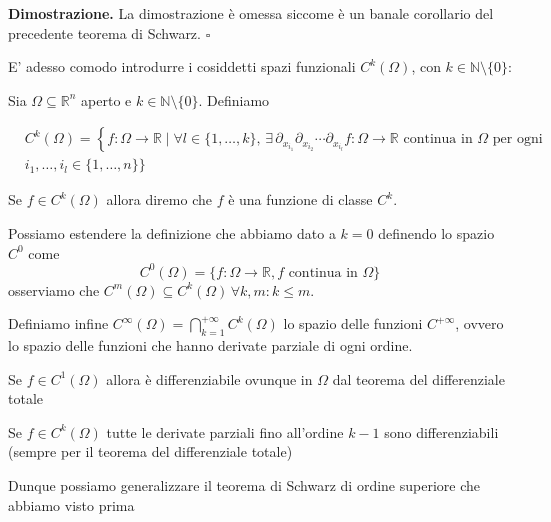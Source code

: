 \noindent \textbf{Dimostrazione. }
La dimostrazione è omessa siccome è un banale corollario del precedente teorema di Schwarz.
\hfill $\square$

E' adesso comodo introdurre i cosiddetti spazi funzionali $C^k(\Omega)$, con $k \in \mathbb{N} \setminus \{ 0 \}$:

\vspace{0.5cm}
\begin{definition}[\textcolor{blue}{spazio $C^k$}]
Sia $\Omega \subseteq \mathbb{R}^n$ aperto e $k \in \mathbb{N} \setminus \{ 0 \}$. Definiamo

\[\begin{aligned}
&C^k(\Omega) = \left\{ f: \Omega \to \mathbb{R} \mid \forall l \in \{1, \ldots, k\}, \, \exists \, \partial_{x_{i_1}} \partial_{x_{i_2}} \cdots \partial_{x_{i_l}} f: \Omega \to \mathbb{R} \text{ continua in } \Omega \text{ per ogni } \right. \\
& i_1, \ldots, i_l \in \{1, \ldots, n\} \Bigg\}
\end{aligned}\]

Se $f \in C^{k}(\Omega)$ allora diremo che $f$ è una funzione di classe $C^k$.
\end{definition}

\begin{remark}
Possiamo estendere la definizione che abbiamo dato a $k=0$ definendo lo spazio $C^{0}$ come
$$
C^{0}(\Omega) = \{f: \Omega \to \mathbb{R}, f \text{ continua in } \Omega \}
$$
osserviamo che $C^{m}(\Omega) \subseteq C^{k}(\Omega) \, \forall k, m : k \leq m$.
\end{remark}

Definiamo infine $C^{\infty}(\Omega) = \bigcap\limits^{+\infty}_{k=1} C^{k}(\Omega)$ lo spazio delle funzioni $C^{+\infty}$, ovvero lo spazio delle funzioni che hanno derivate parziale di ogni ordine.

\begin{remark}
Se $f \in C^1 (\Omega)$ allora è differenziabile ovunque in $\Omega$ dal teorema del differenziale totale
\end{remark}

\begin{remark}
Se $f \in C^{k} (\Omega)$ tutte le derivate parziali fino all'ordine $k-1$ sono differenziabili (sempre per il teorema del differenziale totale)
\end{remark}

Dunque possiamo generalizzare il teorema di Schwarz di ordine superiore che abbiamo visto prima

